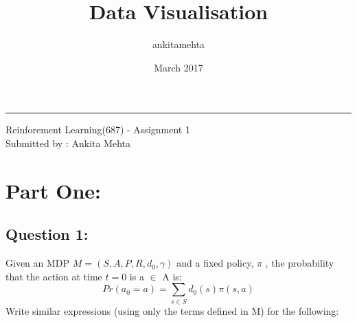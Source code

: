 \documentclass{article}
\title{Data Visualisation}
\author{ankitamehta }
\date{March 2017}
\begin{document}
\hrule height 1pt
\vspace{1em}
\begin{center}
\large{Reinforement Learning(687) - Assignment 1 }\\
\large{Submitted by : Ankita Mehta }\\
\end{center}
\par
\section*{Part One:}

\subsection*{Question 1:}
Given an MDP  \(M = (S, A, P, R, d_0, \gamma)\)  and a fixed policy, $\pi$ , the probability that the action at time \(t=0\)  is a $\in$ A is: \[Pr(a_0 = a) = \sum_{s \in S}d_0(s)\pi(s,a)\]
Write similar expressions (using only the terms defined in M) for the following:
\end{document}
